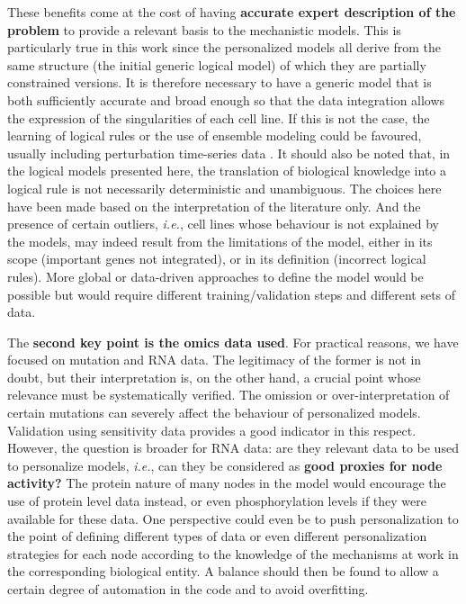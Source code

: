 \documentclass[a4paper,12pt,twoside,onecolumn,openright,final,oldfontcommands]{memoir}
\begin{document}
These benefits come at the cost of having \textbf{accurate expert
description of the problem} to provide a relevant basis to the
mechanistic models. This is particularly true in this work since the
personalized models all derive from the same structure (the initial
generic logical model) of which they are partially constrained versions.
It is therefore necessary to have a generic model that is both
sufficiently accurate and broad enough so that the data integration
allows the expression of the singularities of each cell line. If this is
not the case, the learning of logical rules or the use of ensemble
modeling could be favoured, usually including perturbation time-series
data \citep{razzaq2018computational}. It should also be noted that, in
the logical models presented here, the translation of biological
knowledge into a logical rule is not necessarily deterministic and
unambiguous. The choices here have been made based on the interpretation
of the literature only. And the presence of certain outliers,
\emph{i.e.}, cell lines whose behaviour is not explained by the models,
may indeed result from the limitations of the model, either in its scope
(important genes not integrated), or in its definition (incorrect
logical rules). More global or data-driven approaches to define the
model would be possible but would require different training/validation
steps and different sets of data.

The \textbf{second key point is the omics data used}. For practical
reasons, we have focused on mutation and RNA data. The legitimacy of the
former is not in doubt, but their interpretation is, on the other hand,
a crucial point whose relevance must be systematically verified. The
omission or over-interpretation of certain mutations can severely affect
the behaviour of personalized models. Validation using sensitivity data
provides a good indicator in this respect. However, the question is
broader for RNA data: are they relevant data to be used to personalize
models, \emph{i.e.}, can they be considered as \textbf{good proxies for
node activity?} The protein nature of many nodes in the model would
encourage the use of protein level data instead, or even phosphorylation
levels if they were available for these data. One perspective could even
be to push personalization to the point of defining different types of
data or even different personalization strategies for each node
according to the knowledge of the mechanisms at work in the
corresponding biological entity. A balance should then be found to allow
a certain degree of automation in the code and to avoid overfitting.
\end{document}
